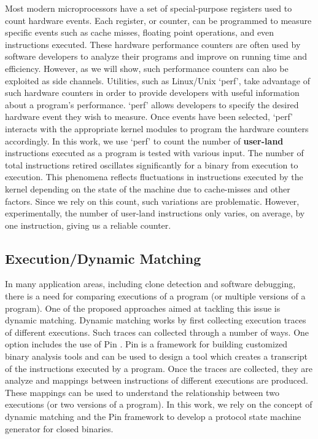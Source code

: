 \documentclass{acm_proc_article-sp}
\begin{document}
Most modern microprocessors have a set of special-purpose registers used to count hardware events.
Each register, or counter, can be programmed to measure specific events such as cache misses, floating point operations, and even instructions executed.
These hardware performance counters are often used by software developers to analyze their programs and improve on running time and efficiency.
However, as we will show, such performance counters can also be exploited as side channels.
Utilities, such as Linux/Unix `perf', take advantage of such hardware counters in order to provide developers with useful information about a program's performance.
`perf' allows developers to specify the desired hardware event they wish to measure.
Once events have been selected, `perf' interacts with the appropriate kernel modules to program the hardware counters accordingly.
In this work, we use `perf' to count the number of \textbf{user-land} instructions executed as a program is tested with various input.
The number of total instructions retired oscillates significantly for a binary from execution to execution.
This phenomena reflects fluctuations in instructions executed by the kernel depending on the state of the machine due to cache-misses and other factors.
Since we rely on this count, such variations are problematic.
However, experimentally, the number of user-land instructions only varies, on average, by one instruction, giving us a reliable counter.

\subsection{Execution/Dynamic Matching} \label{bg_dynamicsim}

In many application areas, including clone detection and software debugging, there is a need for comparing executions of a program (or multiple versions of a program).
One of the proposed approaches aimed at tackling this issue is dynamic matching.
Dynamic matching works by first collecting execution traces of different executions.
Such traces can collected through a number of ways.
One option includes the use of Pin \cite{pintool}.
Pin is a framework for building customized binary analysis tools and can be used to design a tool which creates a transcript of the instructions executed by a program.
Once the traces are collected, they are analyze and mappings between instructions of different executions are produced.
These mappings can be used to understand the relationship between two executions (or two versions of a program).
In this work, we rely on the concept of dynamic matching and the Pin framework to develop a protocol state machine generator for closed binaries.
\end{document}
